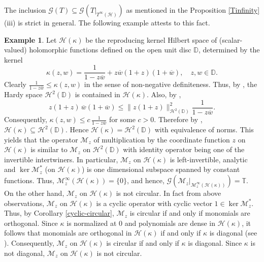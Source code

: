 \documentclass[a4paper,oneside,10pt, reqno]{amsproc}
\theoremstyle{remark}
\newtheorem{remark}[theorem]{Remark}%
\theoremstyle{definition}
\newtheorem{example}[theorem]{Example}
\begin{document}

The inclusion $\mathcal G(T) \subseteq \mathcal G(T|_{T^\infty(\mathcal H)})$ as mentioned in the Proposition \ref{Tinfinity}(iii) is strict in general. The following example attests to this fact. 

\begin{example}
Let $\mathcal H(\kappa)$ be the reproducing kernel Hilbert space of (scalar-valued) holomorphic functions defined on the open unit disc $\mathbb D$, determined by the kernel
\[
\kappa(z,w)=\frac{1}{1-z\overline{w}}+z\overline{w}(1+z)(1+\overline{w}),
\quad z,w\in\mathbb D .
\]
Clearly $\frac{1}{1-z\overline{w}} \leqslant \kappa(z,w)$ in the sense of non-negative definiteness. Thus, by \cite[Theorem 5.1]{PR}, the Hardy space $\mathcal H^2(\mathbb D)$ is contained in $\mathcal H(\kappa)$. Also, by \cite[Theorem 3.11]{PR},
\[
z(1+z)\,\overline{w}(1+\overline{w}) \leqslant
\|z(1+z)\|_{\mathcal H^2(\mathbb D)}^{2}
\frac{1}{1-z\overline{w}} .
\]
Consequently, $\kappa(z,w) \leqslant c\,\frac{1}{1-z\overline{w}}$ for some $c>0$. Therefore by \cite[Theorem 5.1]{PR}, $\mathcal H(\kappa) \subseteq \mathcal H^2(\mathbb D)$. Hence $\mathcal H(\kappa) = \mathcal H^2(\mathbb D)$
with equivalence of norms. This yields that the operator $\mathscr M_z$ of multiplication by the coordinate function $z$ on $\mathcal H(\kappa)$
is similar to $\mathscr M_z$ on $\mathcal H^2(\mathbb D)$ with identity operator being one of the invertible intertwiners. In particular,
$\mathscr M_z$ on $\mathcal H(\kappa)$ is left-invertible, analytic and $\ker \mathscr M_z^*$ (on $\mathcal H(\kappa)$) is one dimensional subspace spanned by constant functions. Thus, $\mathscr M_z^\infty(\mathcal H(\kappa)) = \{0\}$, and hence, $\mathcal G(\mathscr M_z|_{\mathscr M_z^\infty(\mathcal H(\kappa))}) = \mathbb T$. On the other hand, $\mathscr M_z$ on $\mathcal H(\kappa)$ is not circular. In fact from above observations, $\mathscr M_z$ on $\mathcal H(\kappa)$ is a cyclic operator with cyclic vector $1 \in \ker \mathscr M_z^*$. Thus, by Corollary \ref{cyclic-circular}, $\mathscr M_z$ is circular if and only if monomials are orthogonal. Since $\kappa$ is normalized at $0$ and polynomials are dense in $\mathcal H(\kappa)$, it follows that monomials are orthogonal in $\mathcal H(\kappa)$ if and only if $\kappa$ is diagonal (see \cite{CS}). Consequently, $\mathscr M_z$ on $\mathcal H(\kappa)$ is circular if and only if $\kappa$ is diagonal. Since $\kappa$ is not diagonal, $\mathscr M_z$ on $\mathcal H(\kappa)$ is not circular.
\end{example}
\end{document}
